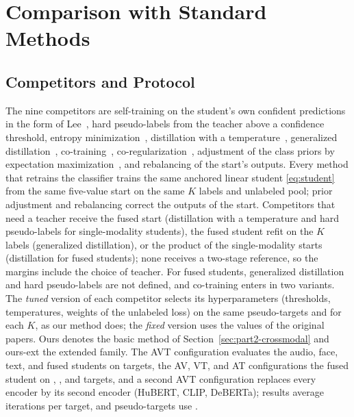 \section{Comparison with Standard Methods}
\label{sec:comparison}


\subsection{Competitors and Protocol}
\label{sec:comparison-protocol}

The nine competitors are self-training on the student's own confident predictions in the form of Lee~\cite{lee2013pseudolabel}, hard pseudo-labels from the teacher above a confidence threshold, entropy minimization~\cite{grandvalet2004semisupervised}, distillation with a temperature~\cite{hinton2015distilling}, generalized distillation~\cite{lopezpaz2016unifying}, co-training~\cite{blum1998combining}, co-regularization~\cite{sindhwani2005coregularization}, adjustment of the class priors by expectation maximization~\cite{saerens2002adjusting}, and rebalancing of the start's outputs.
Every method that retrains the classifier trains the same anchored linear student \eqref{eq:student} from the same five-value start on the same $K$ labels and unlabeled pool; prior adjustment and rebalancing correct the outputs of the start. Competitors that need a teacher receive the fused start (distillation with a temperature and hard pseudo-labels for single-modality students), the fused student refit on the $K$ labels (generalized distillation), or the product of the single-modality starts (distillation for fused students); none receives a two-stage reference, so the margins include the choice of teacher. For fused students, generalized distillation and hard pseudo-labels are not defined, and co-training enters in two variants.
The \emph{tuned} version of each competitor selects its hyperparameters (thresholds, temperatures, weights of the unlabeled loss) on the same pseudo-targets and for each $K$, as our method does; the \emph{fixed} version uses the values of the original papers.
Ours denotes the basic method of Section~\ref{sec:part2-crossmodal} and ours-ext the extended family.
The AVT configuration evaluates the audio, face, text, and fused students on  targets, the AV, VT, and AT configurations the fused student on , , and  targets, and a second AVT configuration replaces every encoder by its second encoder (HuBERT, CLIP, DeBERTa); results average  iterations per target, and pseudo-targets use .

